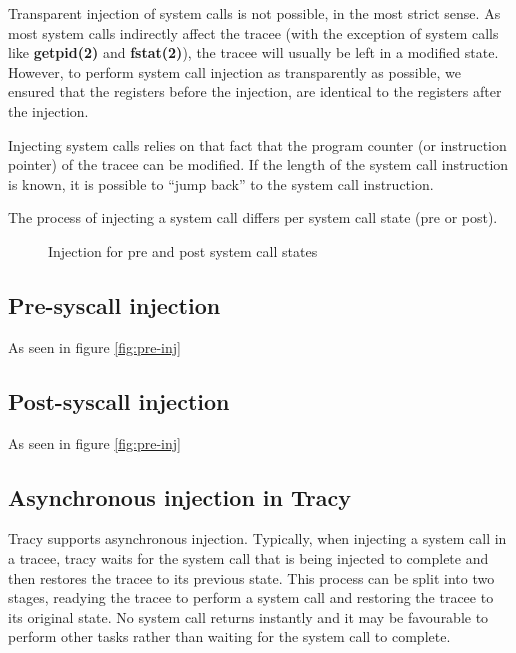 \documentclass[a4paper, 10pt]{report}
\begin{document}
Transparent injection of system calls is not possible, in the most strict sense.
As most system calls indirectly affect the tracee (with the exception of system
calls like \textbf{getpid(2)} and \textbf{fstat(2)}), the tracee will usually
be left in a modified state. However, to perform system call injection as
transparently as possible, we ensured that the registers before the injection,
are identical to the registers after the injection.

Injecting system calls relies on that fact that the program counter (or
instruction pointer) of the tracee can be modified. If the length of the system
call instruction is known, it is possible to ``jump back'' to the system call
instruction. %

The process of injecting a system call differs per system call state (pre or
post).

\begin{figure}
    \centering
    \hspace{1em}
    \caption{Injection for pre and post system call states}
    \label{fig:injection}
\end{figure}


\subsection{Pre-syscall injection}

As seen in figure \ref{fig:pre-inj}

\subsection{Post-syscall injection}

As seen in figure \ref{fig:pre-inj}


\subsection{Asynchronous injection in Tracy}

Tracy supports asynchronous injection. Typically, when injecting a system call
in a tracee, tracy waits for the system call that is being injected to complete
and then restores the tracee to its previous state. This process can be split
into two stages, readying the tracee to perform a system call and restoring
the tracee to its original state. No system call returns instantly and it
may be favourable to perform other tasks rather than waiting for the system
call to complete.
\end{document}
